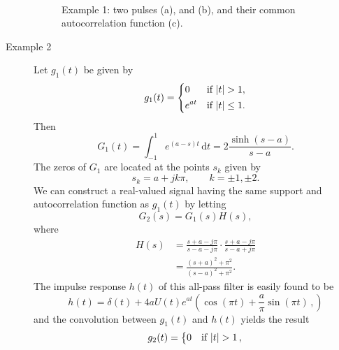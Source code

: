 \begin{description}
\begin{figure}[H]
{    }\\
    \caption[Two pulses with the same autocorrelation]{Example 1: two pulses (a), and (b), and their common
      autocorrelation function (c).}
    \label{fig:math-example1}
  \end{figure}
\item[Example 2]
  Let $g_{1}(t)$ be given by
  \begin{equation}
    \label{eq:35}
    g_{1}(t) =
    \begin{dcases}
      0 & \text{if $|t| > 1$},\\
      e^{at} & \text{if $|t| \leq 1$}.
    \end{dcases}
  \end{equation}
  Then
  \begin{equation}
    \label{eq:39}
    G_{1}(t) = \int_{-1}^{1} e^{(a-s)t}\,\mathrm{d}t = 2\frac{\sinh(s-a)}{s-a}.
  \end{equation}
  The zeros of $G_{1}$ are located at the points $s_{k}$ given by
  \begin{equation}
    \label{eq:40}
    s_{k}=a + jk\pi, \qquad k = \pm 1, \pm 2.
  \end{equation}
  We can construct a real-valued signal having the same support and
  autocorrelation function as $g_{1}(t)$ by letting
  \begin{equation}
    \label{eq:41}
    G_{2}(s)=G_{1}(s)H(s),
  \end{equation}
  where
  \begin{equation}
    \label{eq:114}
    \begin{split}
      H(s)
      & = \frac{s + a - j\pi}{s-a-j\pi}\cdot\frac{s+a-j\pi}{s-a+j\pi}\\
      & = \frac{(s+a)^{2}+\pi^{2}}{(s-a)^{2}+\pi^{2}}.
    \end{split}
  \end{equation}
  The impulse response $h(t)$ of this all-pass filter is easily found
  to be
  \begin{equation}
    \label{eq:43}
    h(t) =  \delta(t) + 4aU(t)e^{at}
    \left(
      \cos(\pi t)+\frac{a}{\pi}\sin(\pi t) \,, 
    \right)
  \end{equation}
  and the convolution between $g_{1}(t)$ and $h(t)$ yields the result
  \begin{equation}
    \label{eq:44}
    g_{2}(t) =
    \begin{dcases}
      0 & \text{if $|t| > 1$}\,, \\

\end{dcases}
\end{equation}
\end{description}
